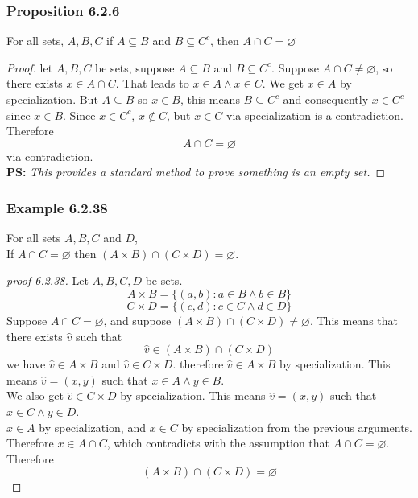 \documentclass[12pt]{book}
\newcommand{\paren}[1]{\left( #1 \right)}
\begin{document}
    \subsubsection{Proposition 6.2.6}
    For all sets, $A,B,C$ if $A \subseteq B$ and $B \subseteq C^c$, then $A \cap C = \varnothing$
    \begin{proof}
        let $A,B,C$ be sets, suppose $A \subseteq B$ and $ B \subseteq C^c$. Suppose $A \cap C \neq \varnothing$, so there exists $x \in A \cap C$. That leads to $x \in A \wedge x \in C$. We get $x \in A$ by specialization. But $A \subseteq B$ so $x \in B$, this means $B \subseteq C^c$ and consequently $x \in C^c$ since $x \in B$. Since $x \in C^c$, $x \notin C$, but $x\in C$ via specialization is a contradiction. Therefore
            \[
            A \cap C = \varnothing
            \]
        via contradiction.\\
        \textbf{PS: }\textit{This provides a standard method to prove something is an empty set.}
    \end{proof}

    \subsubsection{Example 6.2.38}
    For all sets $A,B,C$ and $D$, \\
    If $A \cap C = \varnothing$ then $\paren{A \times B}\cap \paren{C \times D} = \varnothing$.
    \begin{proof}[proof 6.2.38]
        Let $A,B,C,D$ be sets. 
        \[
        A \times B = \{ \paren{a,b} : a\in B \wedge b \in B\}
        \]
        \[
        C \times D = \{ \paren{c,d} : c\in C \wedge d \in D\}
        \]
        Suppose $A \cap C = \varnothing$, and suppose $\paren{A \times B}\cap \paren{C \times D} \neq \varnothing$. This means that there exists $\hat{v}$ such that
        \[
        \hat{v} \in \paren{A \times B}\cap \paren{C \times D}
        \]
        we have $\hat{v} \in A \times B$ and $\hat{v}\in C \times D$. therefore  $\hat{v} \in A \times B$ by specialization. This means $\hat{v} = (x,y)$ such that $x \in A \wedge y \in B$.\\
        We also get $\hat{v} \in C\times D$ by specialization. This means $\hat{v} = (x,y)$ such that $x \in C \wedge y \in D$. \\
        $x \in A$ by specialization, and $x \in C$ by specialization from the previous arguments. Therefore $x \in A \cap C$, which contradicts with the assumption that $A \cap C = \varnothing$. Therefore 
        \[
        \paren{A \times B}\cap \paren{C \times D} = \varnothing
        \]
    \end{proof}
\end{document}
